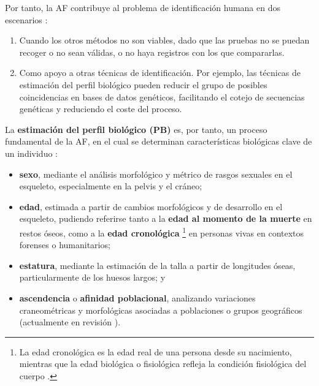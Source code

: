 Por tanto, la AF contribuye al problema de identificación humana en dos escenarios \cite{swganth2010}:  

\begin{enumerate}

    \item Cuando los otros métodos no son viables, dado que las pruebas no se puedan recoger o no sean válidas, o no haya registros con los que compararlas.
    
    \item Como apoyo a otras técnicas de identificación. Por ejemplo, las técnicas de estimación del perfil biológico pueden reducir el grupo de posibles coincidencias en bases de datos genéticos, facilitando el cotejo de secuencias genéticas y reduciendo el coste del proceso.  

\end{enumerate}

La \textbf{estimación del perfil biológico (PB)} es, por tanto, un proceso fundamental de la AF, en el cual se determinan características biológicas clave de un individuo \cite{byers2023}: 

\begin{itemize}

    \item \textbf{sexo}, mediante el análisis morfológico y métrico de rasgos sexuales en el esqueleto, 
    especialmente en la pelvis y el cráneo;
    
    \item \textbf{edad}, estimada a partir de cambios morfológicos y de desarrollo en el esqueleto, pudiendo referirse tanto a la \textbf{edad al momento de la muerte} en restos óseos, como a la \textbf{edad cronológica}%
    \footnote{
        La edad cronológica es la edad real de una persona desde su nacimiento, mientras que la edad biológica o fisiológica refleja la condición fisiológica del cuerpo \cite{marcante2025}.
    }
    en personas vivas en contextos forenses o humanitarios;
    
    \item \textbf{estatura}, mediante la estimación de la talla a partir de longitudes óseas, particularmente de los huesos largos; y
    
    \item \textbf{ascendencia} o \textbf{afinidad poblacional}, analizando variaciones craneométricas y morfológicas asociadas a poblaciones o grupos geográficos (actualmente en revisión \cite{ross2021a, ross2021b, flouri2022}).

\end{itemize}

